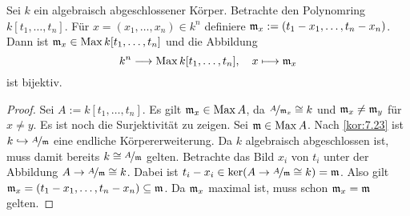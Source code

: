 \documentclass[12pt,a4paper]{scrartcl}
\theoremstyle{cplain}
\theoremstyle{cdef}
\begin{document}
\begin{kor} \label{thm:schwacher nullstellensatz}
	Sei $k$ ein algebraisch abgeschlossener Körper. Betrachte den Polynomring $k[t_1,\dots, t_n]$. Für $x = (x_1,\dots, x_n)\in k^n$ definiere $\mathfrak{m}_x := (t_1-x_1,\dots, t_n-x_n)$. Dann ist $\mathfrak{m}_x\in \operatorname{Max} k[t_1,\dots, t_n]$ und die Abbildung
	\[k^n\longrightarrow \operatorname{Max} k[t_1,\dots, t_n],\quad x\longmapsto \mathfrak{m}_x\]
	ist bijektiv.
\end{kor}
\begin{proof}
	Sei $A := k[t_1,\dots, t_n]$. Es gilt $\mathfrak{m}_x\in\operatorname{Max} A$, da $\nicefrac{A}{\mathfrak{m}_x}\cong k$ und $\mathfrak{m}_x\neq \mathfrak{m}_y$ für $x\neq y$. Es ist noch die Surjektivität zu zeigen. Sei $\mathfrak{m}\in\operatorname{Max} A$. Nach \cref{kor:7.23} ist $k\hookrightarrow \nicefrac{A}{\mathfrak{m}}$ eine endliche Körpererweiterung. Da $k$ algebraisch abgeschlossen ist, muss damit bereits $k\cong \nicefrac{A}{\mathfrak{m}}$ gelten. Betrachte das Bild $x_i$ von $t_i$ unter der Abbildung $A\to \nicefrac{A}{\mathfrak{m}}\cong k$. Dabei ist $t_i-x_i\in\operatorname{ker}(A\to \nicefrac{A}{\mathfrak{m}}\cong k) = \mathfrak{m}$. Also gilt $\mathfrak{m}_x = (t_1-x_1,\dots, t_n-x_n)\subseteq \mathfrak{m}$. Da $\mathfrak{m}_x$ maximal ist, muss schon $\mathfrak{m}_x= \mathfrak{m}$ gelten.
\end{proof}
\end{document}
